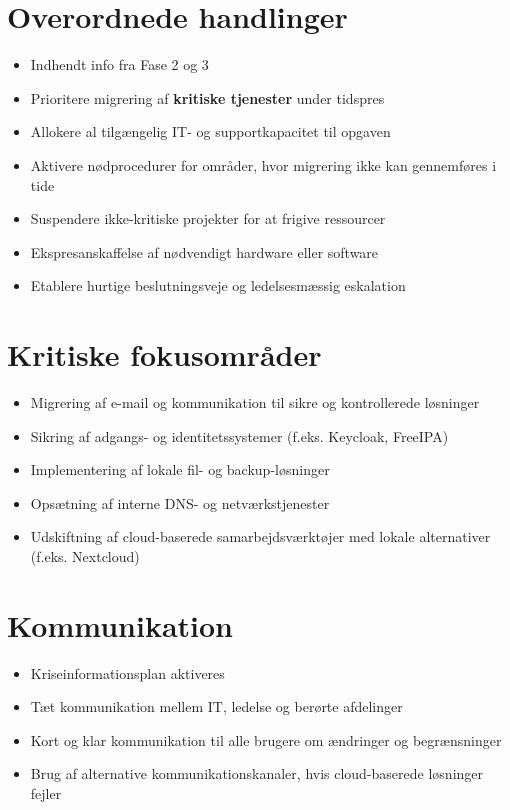 \documentclass[a4paper,11pt,oneside]{book}
\def\tightlist{}
\begin{document}
\section{Overordnede handlinger}\label{overordnede-handlinger}

\begin{itemize}
\tightlist
\item
  Indhendt info fra Fase 2 og 3
\item
  Prioritere migrering af \textbf{kritiske tjenester} under tidspres
\item
  Allokere al tilgængelig IT- og supportkapacitet til opgaven
\item
  Aktivere nødprocedurer for områder, hvor migrering ikke kan
  gennemføres i tide
\item
  Suspendere ikke-kritiske projekter for at frigive ressourcer
\item
  Ekspresanskaffelse af nødvendigt hardware eller software
\item
  Etablere hurtige beslutningsveje og ledelsesmæssig eskalation
\end{itemize}

\section{Kritiske fokusområder}\label{kritiske-fokusomruxe5der}

\begin{itemize}
\tightlist
\item
  Migrering af e-mail og kommunikation til sikre og kontrollerede
  løsninger
\item
  Sikring af adgangs- og identitetssystemer (f.eks. Keycloak, FreeIPA)
\item
  Implementering af lokale fil- og backup-løsninger
\item
  Opsætning af interne DNS- og netværkstjenester
\item
  Udskiftning af cloud-baserede samarbejdsværktøjer med lokale
  alternativer (f.eks. Nextcloud)
\end{itemize}

\section{Kommunikation}\label{kommunikation}

\begin{itemize}
\tightlist
\item
  Kriseinformationsplan aktiveres
\item
  Tæt kommunikation mellem IT, ledelse og berørte afdelinger
\item
  Kort og klar kommunikation til alle brugere om ændringer og
  begrænsninger
\item
  Brug af alternative kommunikationskanaler, hvis cloud-baserede
  løsninger fejler
\end{itemize}
\end{document}
